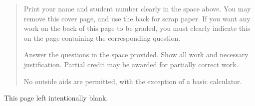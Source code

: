 \documentclass[12pt]{article}
\begin{document}
\vspace{0.1in}

\vspace*{\fill}

\begin{quote}
Print your name and student number clearly in the space above. You may remove this cover page, and use the back for scrap paper. If you want any work on the back of this page to be graded, you must clearly indicate this on the page containing the corresponding question.

\medskip

Answer the questions in the space provided. Show all work and necessary justification. Partial credit may be awarded for partially correct work.
 
\medskip

No outside aids are permitted, with the exception of a basic calculator. 
\end{quote}



\newpage
\thispagestyle{empty}

This page left intentionally blank.

\newpage
\end{document}
